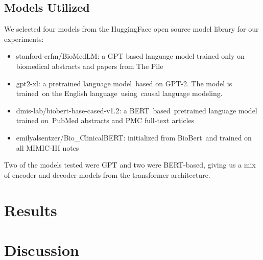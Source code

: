 \documentclass[manuscript,screen,review,nonacm]{acmart}
\begin{document}
\subsection{Models Utilized}
We selected four models from the HuggingFace open source model library for our experiments:
\begin{itemize}
  \item stanford-crfm/BioMedLM: a GPT based language model trained only on biomedical abstracts and papers from The Pile
  \item gpt2-xl: a pretrained language model based on GPT-2. The model is trained on the English language using causal language modeling.
  \item dmis-lab/biobert-base-cased-v1.2: a BERT based pretrained language model trained on PubMed abstracts and PMC full-text articles
  \item emilyalsentzer/Bio\_ClinicalBERT: initialized from BioBert and trained on all MIMIC-III notes
\end{itemize}
Two of the models tested were GPT and two were BERT-based, giving us a mix of encoder and decoder models from the transformer architecture.


\section{Results}

\section{Discussion}




\end{document}

